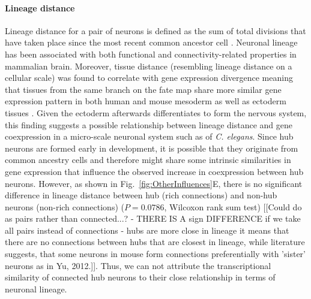 \documentclass[10pt,letterpaper]{article}
\begin{document}
\paragraph{Lineage distance}
Lineage distance for a pair of neurons is defined as the sum of total divisions that have taken place since the most recent common ancestor cell \cite{Pavlovic:2014gx, Sulston1977, Sulston1983}.
Neuronal lineage has been associated with both functional \cite{Ciceri2013, Li2012} and connectivity-related properties \cite{Yu2012} in mammalian brain.
Moreover, tissue distance (resembling lineage distance on a cellular scale) was found to correlate with gene expression divergence meaning that tissues from the same branch on the fate map share more similar gene expression pattern in both human and mouse mesoderm as well as ectoderm tissues \cite{Cui2007}. 
Given the ectoderm afterwards differentiates to form the nervous system, this finding suggests a possible relationship between lineage distance and gene coexpression in a micro-scale neuronal system such as of \textit{C. elegans}.
Since hub neurons are formed early in development, it is possible that they originate from common ancestry cells and therefore might share some intrinsic similarities in gene expression that influence the observed increase in coexpression between hub neurons.
However, as shown in Fig.~\ref{fig:OtherInfluences}E, there is no significant difference in lineage distance between hub (rich connections) and non-hub neurons (non-rich connections) ($P = 0.0786$, Wilcoxon rank sum test) [[Could do as pairs rather than connected...? - THERE IS A sign DIFFERENCE if we take all pairs instead of connections - hubs are more close in lineage it means that there are no connections between hubs that are closest in lineage, while literature suggests, that some neurons in mouse form connections preferentially with 'sister' neurons as in Yu, 2012.]].
Thus, we can not attribute the transcriptional similarity of connected hub neurons to their close relationship in terms of neuronal lineage.
\end{document}
